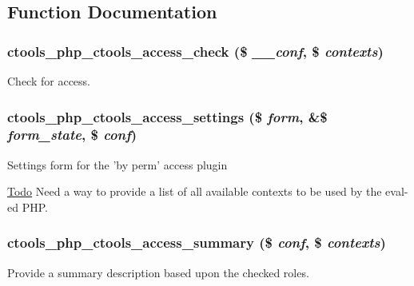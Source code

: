 \subsection{Function Documentation}
\hypertarget{php_8inc_a7acb817afdb0c9ef7b1c6fa6cc71674f}{
\subsubsection[{ctools\_\-php\_\-ctools\_\-access\_\-check}]{\setlength{\rightskip}{0pt plus 5cm}ctools\_\-php\_\-ctools\_\-access\_\-check (\$ {\em \_\-\_\-conf}, \/  \$ {\em contexts})}}
\label{php_8inc_a7acb817afdb0c9ef7b1c6fa6cc71674f}
Check for access. \hypertarget{php_8inc_ad173cf9e9891ef70924fad63a89396fa}{
\subsubsection[{ctools\_\-php\_\-ctools\_\-access\_\-settings}]{\setlength{\rightskip}{0pt plus 5cm}ctools\_\-php\_\-ctools\_\-access\_\-settings (\$ {\em form}, \/  \&\$ {\em form\_\-state}, \/  \$ {\em conf})}}
\label{php_8inc_ad173cf9e9891ef70924fad63a89396fa}
Settings form for the 'by perm' access plugin

\begin{Desc}
\item[\hyperlink{todo__todo000043}{Todo}]Need a way to provide a list of all available contexts to be used by the eval-\/ed PHP. \end{Desc}
\hypertarget{php_8inc_ad017dbac9fb627e7fb7cb9ac4cd95147}{
\subsubsection[{ctools\_\-php\_\-ctools\_\-access\_\-summary}]{\setlength{\rightskip}{0pt plus 5cm}ctools\_\-php\_\-ctools\_\-access\_\-summary (\$ {\em conf}, \/  \$ {\em contexts})}}
\label{php_8inc_ad017dbac9fb627e7fb7cb9ac4cd95147}
Provide a summary description based upon the checked roles. 

